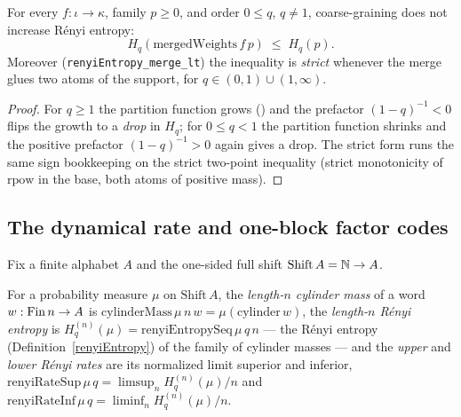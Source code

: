 \begin{theorem}\label{renyiEntropy_merge_le}
  \leanok
  For every \(f : \iota \to \kappa\), family \(p \ge 0\), and order \(0 \le q\), \(q \ne 1\),
  coarse-graining does not increase R\'enyi entropy:
  \[
    H_q(\mathrm{mergedWeights}\,f\,p) \;\le\; H_q(p).
  \]
  Moreover (\texttt{renyiEntropy\_merge\_lt}) the inequality is \emph{strict} whenever the merge glues
  two atoms of the support, for \(q \in (0,1) \cup (1,\infty)\).
\end{theorem}
\begin{proof}\leanok
  For \(q \ge 1\) the partition function grows () and the prefactor
  \((1-q)^{-1} < 0\) flips the growth to a \emph{drop} in \(H_q\); for \(0 \le q < 1\) the partition
  function shrinks and the positive prefactor \((1-q)^{-1} > 0\) again gives a drop. The strict form
  runs the same sign bookkeeping on the strict two-point inequality (strict monotonicity of
  \(\mathrm{rpow}\) in the base, both atoms of positive mass).
\end{proof}

\subsection*{The dynamical rate and one-block factor codes}

Fix a finite alphabet \(A\) and the one-sided full shift \(\mathrm{Shift}\,A = \mathbb{N} \to A\).

\begin{definition}\label{renyiRateSup}
  \leanok
  For a probability measure \(\mu\) on \(\mathrm{Shift}\,A\), the \emph{length-\(n\) cylinder mass}
  of a word \(w : \operatorname{Fin} n \to A\) is \(\mathrm{cylinderMass}\,\mu\,n\,w = \mu(\text{cylinder}\,w)\),
  the \emph{length-\(n\) R\'enyi entropy} is \(H_q^{(n)}(\mu) = \mathrm{renyiEntropySeq}\,\mu\,q\,n\)
  --- the R\'enyi entropy (Definition~\ref{renyiEntropy}) of the family of cylinder masses --- and
  the \emph{upper} and \emph{lower R\'enyi rates} are its normalized limit superior and inferior,
  \(\mathrm{renyiRateSup}\,\mu\,q = \limsup_n H_q^{(n)}(\mu)/n\) and
  \(\mathrm{renyiRateInf}\,\mu\,q = \liminf_n H_q^{(n)}(\mu)/n\).
\end{definition}

